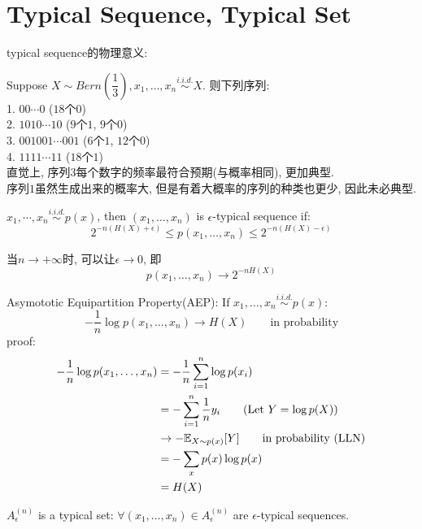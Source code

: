 \section{Typical Sequence, Typical Set}
typical sequence的物理意义:
\begin{example}
Suppose $X\sim Bern\left(\dfrac{1}{3}\right), x_1,\ldots,x_n\stackrel{i.i.d.}{\sim}X$. 则下列序列: \\
1. $00\cdots 0$ ($18$个$0$) \\
2. $1010\cdots 10$ ($9$个$1$, $9$个$0$) \\
3. $001001\cdots 001$ ($6$个$1$, $12$个$0$) \\
4. $1111\cdots 11$ ($18$个$1$) \\
直觉上, 序列$3$每个数字的频率最符合预期(与概率相同), 更加典型. \\
序列$1$虽然生成出来的概率大, 但是有着大概率的序列的种类也更少, 因此未必典型.
\end{example}
\begin{definition}
$x_1,\cdots,x_n\stackrel{i.i.d.}{\sim}p(x)$, then $(x_1,\ldots,x_n)$ is $\epsilon$-typical sequence if:
$$2^{-n\left(H(X)+\epsilon\right)}\leq p(x_1,\ldots,x_n) \leq 2^{-n\left(H(X)-\epsilon\right)}$$
\end{definition}
当$n\to+\infty$时, 可以让$\epsilon\to 0$, 即
$$p(x_1,\ldots,x_n)\to 2^{-nH(X)}$$

\begin{theorem}
\label{thm:AEP}
Asymototic Equipartition Property(AEP): If $x_1,\ldots,x_n\stackrel{i.i.d.}{\sim}p(x)$:
$$-\dfrac{1}{n}\log p(x_1,\ldots,x_n)\to H(X) \qquad\text{in probability}$$
proof:
\begin{align*}
-\dfrac{1}{n}\log p(x_1,\ldots,x_n) &= -\dfrac{1}{n}\sum_{i=1}^{n}\log p(x_i) \\
&= -\sum_{i=1}^{n}\dfrac{1}{n}y_i \text{\qquad (Let $Y=\log p(X)$)} \\
&\to -\mathbb{E}_{X\sim p(x)}[Y] \text{\qquad in probability (LLN)} \\
&= -\sum_{x}p(x)\log p(x) \\
&= H(X)
\end{align*}
\end{theorem}

\begin{definition}
$A_{\epsilon}^{(n)}$ is a typical set: $\forall (x_1,\ldots,x_n)\in A_{\epsilon}^{(n)}$ are $\epsilon$-typical sequences.
\end{definition}

